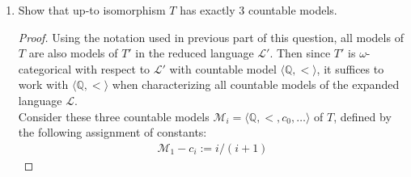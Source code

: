 \documentclass{article}
\begin{document}
\begin{enumerate}[label={\bf Q\arabic*:}]
\begin{enumerate}
\begin{proof}
          Now we prove that $T$ is complete. Assume by contradiction that
          it is not. Then there is a sentence $\varphi(c_1,\ldots,c_n)$ in
          language $\mathcal{L}$ and models $\mathcal{M}$ and $\mathcal{N}$
          of $T$ such that $\mathcal{M}\models\varphi(c_1,\ldots,c_n)$ but
          $\mathcal{N}\models\neg\varphi(c_1,\ldots,c_n)$. Note that the
          sentence $\varphi(c_1,\ldots,c_n)$ cannot be a sentence in the
          reduced language $\mathcal{L}'$ because $\mathcal{M}$ and
          $\mathcal{N}$ are also models of $T'$ and $T'$ is a complete
          theory. Now from the claim in the above paragraph,
          $\mathcal{M}\models\varphi(c_1,\ldots,c_n)$ implies
          $\mathcal{M}\models\phi$, where $\phi$ is defined as
          \begin{align*}
            \phi:= \forall x_1,\ldots,x_n\;\;
              x_1<\ldots<x_n\rightarrow\varphi(x_1,\ldots,x_n).
          \end{align*}
          Then $\phi$ is a sentence in the reduced language $\mathcal{L}'$,
          so by completeness of $T'$ and from the fact that $\mathcal{N}$
          is also a model of $T'$ in the reduced language, $\phi$ must also
          be true in $\mathcal{N}$. This would contradict
          $\mathcal{N}\models\neg\varphi(c_1,\ldots,c_n)$.
        \end{proof}

      \item Show that up-to isomorphism $T$ has exactly 3 countable models.
        \begin{proof}
          Using the notation used in previous part of this question, all
          models of $T$ are also models of $T'$ in the reduced language
          $\mathcal{L}'$. Then since $T'$ is $\omega$-categorical with
          respect to $\mathcal{L}'$ with countable model
          $\langle\mathbb{Q},<\rangle$, it suffices to work with
          $\langle\mathbb{Q},<\rangle$ when characterizing all countable
          models of the expanded language $\mathcal{L}$. \\

          Consider these three countable models
          $\mathcal{M}_i=\langle\mathbb{Q},<,c_0,\ldots\rangle$ of $T$,
          defined by the following assignment of constants:
          \begin{align*}
            \mathcal{M}_1 - c_i:= i/(i+1)
          \end{align*}
        \end{proof}
    \end{enumerate}
\end{enumerate}
\end{document}
